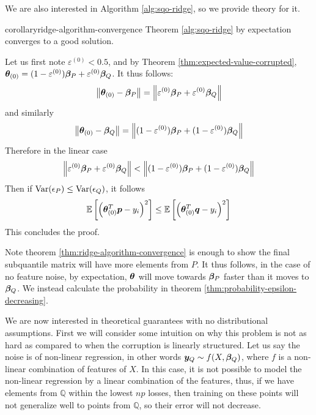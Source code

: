 \documentclass{article} %
\newenvironment{proofsketch}{%
	\renewcommand{\proofname}{Proof Sketch}\proof}{\endproof}
\newcommand{\norm}[1]{\left\lVert#1\right\rVert}
\begin{document}
	We are also interested in Algorithm \ref{alg:sqo-ridge}, so we provide theory for it.
	\begin{restatable}{corollary}{ridge-algorithm-convergence}
		\label{thm:ridge-algorithm-convergence}
		Theorem \ref{alg:sqo-ridge} by expectation converges to a good solution. 
	\end{restatable}
	\begin{proofsketch}
		Let us first note $\varepsilon^{(0)} < 0.5$, and by Theorem \ref{thm:expected-value-corrupted}, ${\bm{\theta}}_{(0)} = (1-\varepsilon^{(0)}){\bm{\beta}}_P + \varepsilon^{(0)}{\bm{\beta}}_Q$. It thus follows:
		\begin{equation}
			\norm{\vtheta_{(0)} - \vbeta_P} = \norm{\varepsilon^{(0)}\vbeta_P + \varepsilon^{(0)}\vbeta_Q}
		\end{equation}
		and similarly 
		\begin{equation}
			\norm{\vtheta_{(0)} - \vbeta_Q} = \norm{(1 - \varepsilon^{(0)})\vbeta_P + (1 - \varepsilon^{(0)}) \vbeta_Q}
		\end{equation}
		Therefore in the linear case 
		\begin{equation}\label{eqn:theta-0-closer-to-p}
			\norm{\varepsilon^{(0)}\vbeta_P + \varepsilon^{(0)}\vbeta_Q} < \norm{(1 - \varepsilon^{(0)})\vbeta_P + (1 - \varepsilon^{(0)}) \vbeta_Q}
		\end{equation}
		Then if $\mathrm{Var}(\epsilon_P) \leq \mathrm{Var}(\epsilon_Q)$, it follows 
		\begin{equation*}
			\mathbb{E}\left[\left({\bm{\theta}}_{(0)}^T {\bm{p}} - y_i\right)^2\right] \leq \mathbb{E}\left[\left({\bm{\theta}}_{(0)}^T {\bm{q}} - y_i\right)^2\right]
		\end{equation*}	
		This concludes the proof.
	\end{proofsketch}
	
	Note theorem \ref{thm:ridge-algorithm-convergence} is enough to show the final subquantile matrix will have more elements from $P$. It thus follows, in the case of no feature noise, by expectation, ${\bm{\theta}}$ will move towards ${\bm{\beta}}_P$ faster than it moves to ${\bm{\beta}}_Q$. We instead calculate the probability in theorem \ref{thm:probability-epsilon-decreasing}. 
	
	We are now interested in theoretical guarantees with no distributional assumptions. First we will consider some intuition on why this problem is not as hard as compared to when the corruption is linearly structured. Let us say the noise is of non-linear regression, in other words ${\bm{y}}_Q \sim f(X,{\bm{\beta}}_Q)$, where $f$ is a non-linear combination of features of $X$. In this case, it is not possible to model the non-linear regression by a linear combination of the features, thus, if we have elements from $\mathbb{Q}$ within the lowest $np$ losses, then training on these points will not generalize well to points from $\mathbb{Q}$, so their error will not decrease. 
\end{document}
